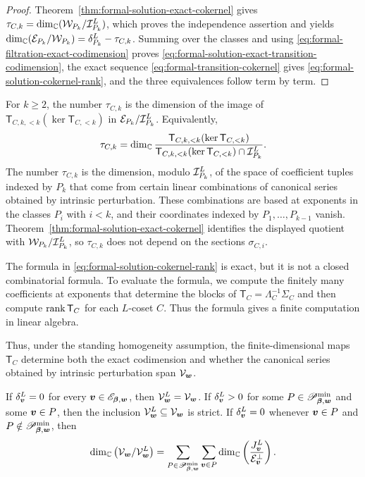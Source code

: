\begin{proof}
	Theorem~\ref{thm:formal-solution-exact-cokernel} gives \(\tau_{C,k}=\dim_{\mathbb C}(\mathcal W_{P_k}/\mathcal I_{P_k}^{L})\), which proves the independence assertion and yields \(\dim_{\mathbb C}(\mathcal E_{P_k}/\mathcal W_{P_k})=\delta_{P_k}^{L}-\tau_{C,k}\).
	Summing over the classes and using \eqref{eq:formal-filtration-exact-codimension} proves \eqref{eq:formal-solution-exact-transition-codimension}, the exact sequence \eqref{eq:formal-transition-cokernel} gives \eqref{eq:formal-solution-cokernel-rank}, and the three equivalences follow term by term.
\end{proof}

\begin{remark}
	For \(k\geq2\), the number \(\tau_{C,k}\) is the dimension of the image of \(\mathsf T_{C,k,<k}(\ker\mathsf T_{C,<k})\) in \(\mathcal E_{P_k}/\mathcal I_{P_k}^{L}\).
	Equivalently,
	\[
		\tau_{C,k}
		=
		\dim_{\mathbb C}
		\frac{
			\mathsf T_{C,k,<k}(\ker\mathsf T_{C,<k})}
		{
			\mathsf T_{C,k,<k}(\ker\mathsf T_{C,<k})
			\cap
			\mathcal I_{P_k}^{L}}.
	\]
	The number \(\tau_{C,k}\) is the dimension, modulo \(\mathcal I_{P_k}^{L}\), of the space of coefficient tuples indexed by \(P_k\) that come from certain linear combinations of canonical series obtained by intrinsic perturbation.
	These combinations are based at exponents in the classes \(P_i\) with \(i<k\), and their coordinates indexed by \(P_1,\ldots,P_{k-1}\) vanish.
	Theorem~\ref{thm:formal-solution-exact-cokernel} identifies the displayed quotient with \(\mathcal W_{P_k}/\mathcal I_{P_k}^{L}\), so \(\tau_{C,k}\) does not depend on the sections \(\sigma_{C,i}\).
\end{remark}

\begin{remark}
	The formula in \eqref{eq:formal-solution-cokernel-rank} is exact, but it is not a closed combinatorial formula.
	To evaluate the formula, we compute the finitely many coefficients at exponents that determine the blocks of \(\mathsf T_C=\Lambda_C^{-1}\Sigma_C\) and then compute \(\operatorname{rank}\mathsf T_C\) for each \(L\)-coset \(C\).
	Thus the formula gives a finite computation in linear algebra.
\end{remark}

Thus, under the standing homogeneity assumption, the finite-dimensional maps \(\mathsf T_C\) determine both the exact codimension and whether the canonical series obtained by intrinsic perturbation span \(\mathcal V_{\boldsymbol{w}}\).

\begin{corollary}
	\label{cor:formal-solution-completeness}
	If \(\delta_{\boldsymbol{v}}^{L}=0\) for every \(\boldsymbol{v}\in\mathscr E_{\boldsymbol{\beta},\boldsymbol{w}}\), then \(\mathcal V_{\boldsymbol{w}}^{L}=\mathcal V_{\boldsymbol{w}}\).
	If \(\delta_{\boldsymbol{v}}^{L}>0\) for some \(P\in\mathscr P_{\boldsymbol{\beta},\boldsymbol{w}}^{\min}\) and some \(\boldsymbol{v}\in P\), then the inclusion \(\mathcal V_{\boldsymbol{w}}^{L}\subseteq\mathcal V_{\boldsymbol{w}}\) is strict.
	If \(\delta_{\boldsymbol{v}}^{L}=0\) whenever \(\boldsymbol{v}\in P\) and \(P\notin\mathscr P_{\boldsymbol{\beta},\boldsymbol{w}}^{\min}\), then
	\[
		\dim_{\mathbb C}
		\left(
		\mathcal V_{\boldsymbol{w}}/\mathcal V_{\boldsymbol{w}}^{L}
		\right)
		=
		\sum_{P\in\mathscr P_{\boldsymbol{\beta},\boldsymbol{w}}^{\min}}
		\sum_{\boldsymbol{v}\in P}
		\dim_{\mathbb C}
		\left(
		\frac{J_{\boldsymbol{v}}^{L}}
		{\mathcal E_{\boldsymbol{v}}^{\perp}}
		\right).
	\]
\end{corollary}

